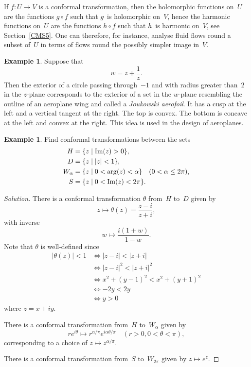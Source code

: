 \documentclass{amsproc}
\theoremstyle{definition}
\newtheorem{example}[theorem]{Example}
\newenvironment{solution}{\begin{proof}[Solution]}{\end{proof}}
\theoremstyle{remark}
\renewcommand{\Im}{\mathop{\textup{Im}}}
\numberwithin{equation}{section}
\begin{document}
If $ f:U \to  V $ is a conformal transformation, then the holomorphic functions on~$ U $ are the functions $ g \circ f $ such that $ g $~is holomorphic on~$ V $,
hence the harmonic functions on~$ U $ are the functions $ h \circ f $ such that $ h $~is harmonic on~$ V $, see Section~\ref{CMS5}. One can therefore, for instance, analyse fluid
flows round a subset of~$ U $ in terms of flows round the possibly simpler image in~$ V $.

\begin{example} \label{CME14.4}
Suppose that
$$
w = z + \dfrac{1}{z}.
$$
Then the exterior of a circle passing through~$ -1 $ and with radius greater than~$ 2 $ in the $ z $-plane corresponds to the exterior of a set in the $ w $-plane resembling
the outline of an aeroplane wing and called a \emph{Joukowski aerofoil}. It has a cusp at the left and a vertical tangent at the right. The top is convex. The bottom is concave
at the left and convex at the right. This idea is used in the design of aeroplanes.
\end{example}

\begin{example} \label{CME14.5}
Find conformal transformations between the sets
\begin{align*}
H &= \{z \mid \Im(z) > 0\}, \\
D &= \{z \mid |z| < 1\}, \\
W_\alpha &= \{z \mid 0 < \arg(z) < \alpha\} \quad (0 < \alpha \leq 2\pi), \\
S &= \{z \mid 0 < \Im(z) < 2\pi\}.
\end{align*}
\end{example}

\begin{solution}
There is a conformal transformation $ \theta $ from~$ H $ to~$ D $ given by
$$
z \mapsto \theta(z) = \dfrac{z - i}{z + i},
$$
with inverse
$$
w \mapsto \dfrac{i(1 + w)}{1 - w}.
$$
Note that $ \theta $ is well-defined since
\begin{align*}
|\theta(z)| < 1
&\iff |z - i| < |z + i| \\
&\iff |z - i|^2 < |z + i|^2 \\
&\iff x^2 + (y - 1)^2 < x^2 + (y + 1)^2 \\
&\iff -2y < 2y \\
&\iff y > 0
\end{align*}
where $ z = x + i y $.

There is a conformal transformation from~$ H $ to~$ W_\alpha $ given by
$$
re^{i\theta} \mapsto r^{\alpha/\pi} e^{i\alpha\theta/\pi} \quad (r > 0, 0 < \theta < \pi),
$$
corresponding to a choice of $ z \mapsto z^{\alpha/\pi} $.

There is a conformal transformation from~$ S $ to~$ W_{2\pi} $ given by $ z \mapsto e^z $.
\end{solution}
\end{document}
